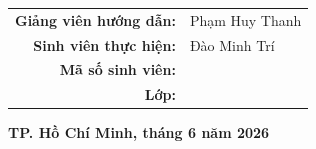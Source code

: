 \begin{titlepage}
\begin{center}
    \renewcommand{\arraystretch}{1.5}
    \begin{tabular}{r l}
        \textbf{Giảng viên hướng dẫn:} & Phạm Huy Thanh \\
        \textbf{Sinh viên thực hiện:}  & Đào Minh Trí \\
        \textbf{Mã số sinh viên:}      & \dotfill{} \\
        \textbf{Lớp:}                  & \dotfill{} \\
    \end{tabular}
\end{center}

\vfill
\begin{center}
    {\bfseries TP. Hồ Chí Minh, tháng 6 năm 2026}
\end{center}

\end{titlepage}
\restoregeometry
